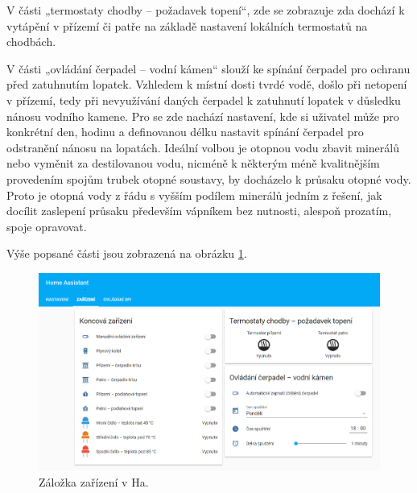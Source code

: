 V části „termostaty chodby – požadavek topení“, zde se zobrazuje zda dochází k vytápění v přízemí či patře na základě nastavení lokálních termostatů na chodbách.

V části „ovládání čerpadel – vodní kámen“ slouží ke spínání čerpadel pro ochranu před zatuhnutím lopatek. Vzhledem k místní dosti tvrdé vodě, došlo při netopení v přízemí, tedy při nevyužívání daných čerpadel k zatuhnutí lopatek v důsledku nánosu vodního kamene. Pro se zde nachází nastavení, kde si uživatel může pro konkrétní den, hodinu a definovanou délku nastavit spínání čerpadel pro odstranění nánosu na lopatách. Ideální volbou je otopnou vodu zbavit minerálů nebo vyměnit za destilovanou vodu, nicméně k některým méně kvalitnějším provedením spojům trubek otopné soustavy, by docházelo k průsaku otopné vody. Proto je otopná vody z řádu s vyšším podílem minerálů jedním z řešení, jak docílit zaslepení průsaku především vápníkem bez nutnosti, alespoň prozatím, spoje opravovat.

Výše popsané části jsou zobrazená na obrázku \ref{fig:ha-zarizeni}.

\begin{figure}[H]
    \centering
    \includegraphics[width=\textwidth]{images/software-ha/ha-zarizeni.png}
    \caption{Záložka zařízení v Ha.}
    \label{fig:ha-zarizeni}
\end{figure}


